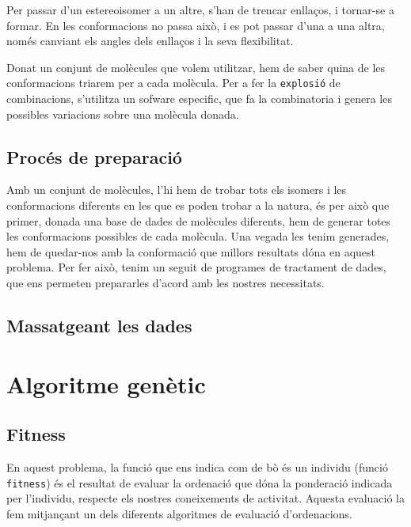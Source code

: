 \documentclass[titlepage,a4paper,12pt]{book}
\begin{document}
Per passar d'un estereoisomer a un altre, s'han de trencar enllaços, i tornar-se a formar.  En les
conformacions no passa això, i es pot passar d'una a una altra, només canviant els angles dels
enllaços i la seva flexibilitat. 

Donat un conjunt de molècules que volem utilitzar, hem de saber quina de les conformacions triarem
per a cada molècula.  Per a fer la \texttt{explosió} de combinacions, s'utilitza un sofware
especific, que fa la combinatoria i genera les possibles variacions sobre una molècula donada. 

\subsection{Procés de preparació} %
\label{sub:Proces de preparacio}

Amb un conjunt de molècules, l'hi hem de trobar tots els isomers i les conformacions diferents en
les que es poden trobar a la natura, és per això que primer, donada una base de dades de molècules
diferents, hem de generar totes les conformacions possibles de cada molècula.  Una vegada les tenim
generades, hem de quedar-nos amb la conformació que millors resultats dóna en aquest problema.  Per
fer això, tenim un seguit de programes de tractament de dades, que ens permeten prepararles d'acord
amb les nostres necessitats.

\subsection{Massatgeant les dades} %
\label{sub:Massatgeant les dades}



\section{Algoritme genètic} %
\label{sec:Algoritme genetic}

\subsection{Fitness} %
\label{sub:Fitness}
En aquest problema, la funció que ens indica com de bò és un individu (funció \texttt{fitness}) és
el resultat de evaluar la ordenació que dóna la ponderació indicada per l'individu, respecte els
nostres coneixements de activitat. Aquesta evaluació la fem mitjançant un dels diferents algoritmes
de evaluació d'ordenacions.
\end{document}
